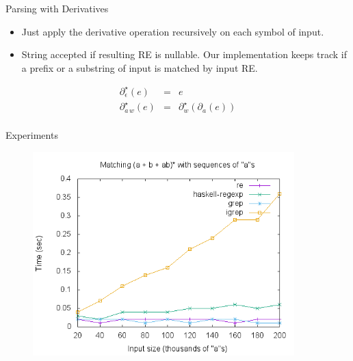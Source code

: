 \documentclass[14pt]{beamer}
\begin{document}
     \begin{frame}{Parsing with Derivatives}
        \begin{itemize}
           \item Just apply the derivative operation recursively on each symbol
           of input.
           \item String accepted if resulting RE is nullable. Our implementation
           keeps track if a prefix or a substring of input is matched by input RE.
        \end{itemize}
        \[
        \begin{array}{lcl}
          \partial_\epsilon^\star(e) & = & e\\
          \partial_{a\,w}^\star(e) & = & \partial_w^\star(\partial_a(e))\\
        \end{array}
        \]
     \end{frame}
     \begin{frame}{Experiments}
        \begin{figure}[!ht]
            \includegraphics[width=0.9\textwidth]{as.png}
           \centering
           \label{fig:graph1}
        \end{figure}
     \end{frame}
\end{document}
